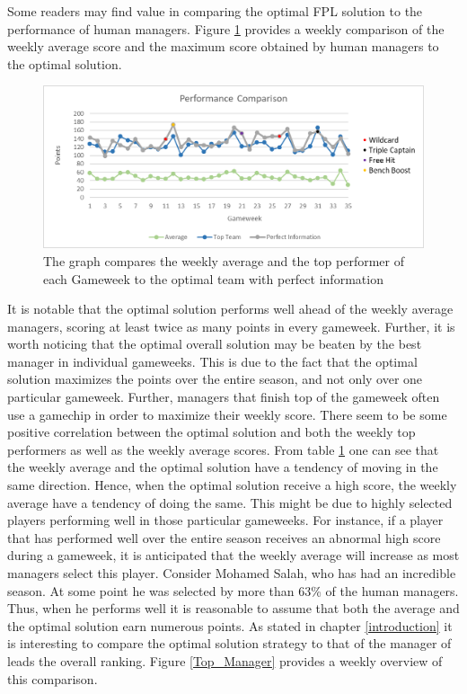 Some readers may find value in comparing the optimal FPL solution to the performance of human managers. Figure \ref{Figure_Comparison} provides a weekly comparison of the weekly average score and the maximum score obtained by human managers to the optimal solution.

\begin{figure}[H]
\label{fig:Comparison}
    \centering
    \includegraphics[scale=0.75]{fig/chapter_7/Comparison_colour.png}
    \caption{The graph compares the weekly average and the top performer of each Gameweek to the optimal team with perfect information}
\label{Figure_Comparison}    
\end{figure}

 It is notable that the optimal solution performs well ahead of the weekly average managers, scoring at least twice as many points in every gameweek. Further, it is worth noticing that the optimal overall solution may be beaten by the best manager in individual gameweeks. This is due to the fact that the optimal solution maximizes the points over the entire season, and not only over one particular gameweek. Further, managers that finish top of the gameweek often use a gamechip in order to maximize their weekly score. 
\newpar
There seem to be some positive correlation between the optimal solution and both the weekly top performers as well as the weekly average scores. From table \ref{Figure_Comparison} one can see that the weekly average and the optimal solution have a tendency of moving in the same direction. Hence, when the optimal solution receive a high score, the weekly average have a tendency of doing the same. This might be due to highly selected players performing well in those particular gameweeks. For instance, if a player that has performed well over the entire season receives an abnormal high score during a gameweek, it is anticipated that the weekly average will increase as most managers select this player. Consider Mohamed Salah, who has had an incredible season. At some point he was selected by more than 63\% of the human managers. Thus, when he performs well it is reasonable to assume that both the average and the optimal solution earn numerous points. 
\newpar
As stated in chapter \ref{introduction} it is interesting to compare the optimal solution strategy to that of the manager of leads the overall ranking. Figure \ref{Top_Manager} provides a weekly overview of this comparison.


